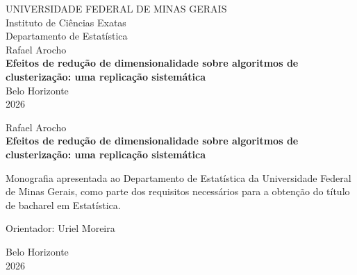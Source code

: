 \documentclass[12pt,a4paper]{report}
\begin{document}
\begin{titlepage}
  \centering
  \vspace*{1cm}
  {\large UNIVERSIDADE FEDERAL DE MINAS GERAIS}\\[0.3cm]
  {\large Instituto de Ciências Exatas}\\[0.3cm]
  {\large Departamento de Estatística}\\[4cm]
  {\large Rafael Arocho}\\[4cm]
  {\Large \textbf{Efeitos de redução de dimensionalidade sobre algoritmos
      de clusterização: uma replicação sistemática}}\\[0cm]
  \vfill
  {\large Belo Horizonte}\\[0.2cm]
  {\large 2026}
\end{titlepage}

\begin{titlepage}
  \centering
  \vspace*{1cm}
  {\large Rafael Arocho}\\[4cm]
  {\Large \textbf{Efeitos de redução de dimensionalidade sobre algoritmos
      de clusterização: uma replicação sistemática}}\\[3cm]
  \begin{flushright}
    \begin{minipage}{0.55\textwidth}
      Monografia apresentada ao Departamento de Estatística da
      Universidade Federal de Minas Gerais, como parte dos requisitos
      necessários para a obtenção do título de bacharel em Estatística.

      \vspace{0.8cm}
      Orientador: Uriel Moreira
    \end{minipage}
  \end{flushright}
  \vfill
  {\large Belo Horizonte}\\[0.2cm]
  {\large 2026}
\end{titlepage}

\setcounter{page}{2}
\end{document}
